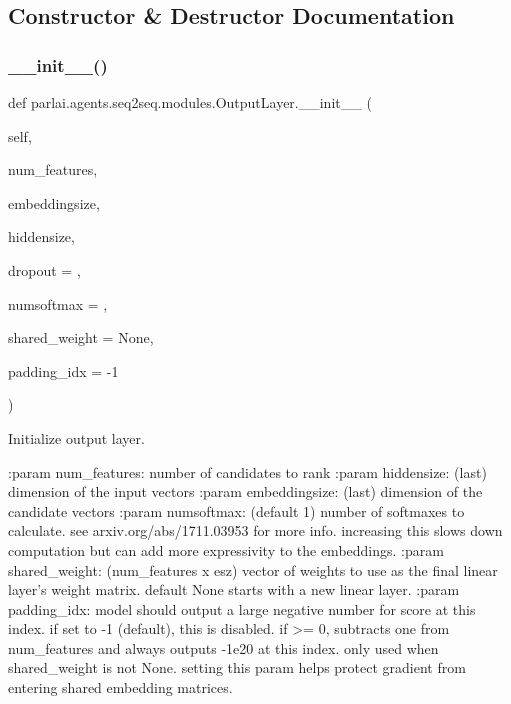 \subsection{Constructor \& Destructor Documentation}
\mbox{\label{classparlai_1_1agents_1_1seq2seq_1_1modules_1_1OutputLayer_ae79d593ea8038932fc431369de1fa91d}} 
\subsubsection{\texorpdfstring{\+\_\+\+\_\+init\+\_\+\+\_\+()}{\_\_init\_\_()}}
{\footnotesize\ttfamily def parlai.\+agents.\+seq2seq.\+modules.\+Output\+Layer.\+\_\+\+\_\+init\+\_\+\+\_\+ (\begin{DoxyParamCaption}\item[{}]{self,  }\item[{}]{num\+\_\+features,  }\item[{}]{embeddingsize,  }\item[{}]{hiddensize,  }\item[{}]{dropout = {},  }\item[{}]{numsoftmax = {},  }\item[{}]{shared\+\_\+weight = {\ttfamily None},  }\item[{}]{padding\+\_\+idx = {\ttfamily -\/1} }\end{DoxyParamCaption})}

\begin{DoxyVerb}Initialize output layer.

:param num_features:  number of candidates to rank
:param hiddensize:    (last) dimension of the input vectors
:param embeddingsize: (last) dimension of the candidate vectors
:param numsoftmax:   (default 1) number of softmaxes to calculate.
              see arxiv.org/abs/1711.03953 for more info.
              increasing this slows down computation but can
              add more expressivity to the embeddings.
:param shared_weight: (num_features x esz) vector of weights to use as
              the final linear layer's weight matrix. default
              None starts with a new linear layer.
:param padding_idx:   model should output a large negative number for
              score at this index. if set to -1 (default),
              this is disabled. if >= 0, subtracts one from
              num_features and always outputs -1e20 at this
              index. only used when shared_weight is not None.
              setting this param helps protect gradient from
              entering shared embedding matrices.
\end{DoxyVerb}
 

